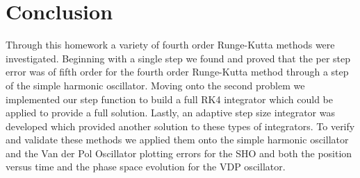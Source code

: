 \documentclass{article}
\begin{document}
\section{Conclusion}
Through this homework a variety of fourth order Runge-Kutta methods were investigated. Beginning with a single step we found and proved that the per step error was of fifth order for the fourth order Runge-Kutta method through a step of the simple harmonic oscillator. Moving onto the second problem we implemented our step function to build a full RK4 integrator which could be applied to provide a full solution. Lastly, an adaptive step size integrator was developed which provided another solution to these types of integrators. To verify and validate these methods we applied them onto the simple harmonic oscillator and the Van der Pol Oscillator plotting errors for the SHO and both the position versus time and the phase space evolution for the VDP oscillator.
\end{document}
